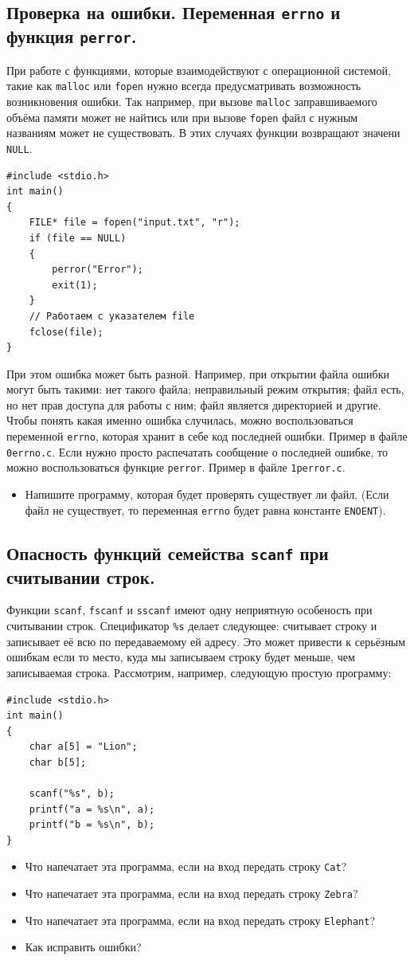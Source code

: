 \documentclass{article}
\begin{document}
\subsection*{Проверка на ошибки. Переменная \texttt{errno} и функция \texttt{perror}.}
При работе с функциями, которые взаимодействуют с операционной системой, такие как \texttt{malloc} или \texttt{fopen} нужно всегда предусматривать возможность возникновения ошибки. Так например, при вызове \texttt{malloc} заправшиваемого объёма памяти может не найтись или при вызове \texttt{fopen} файл с нужным названиям может не существовать. В этих случаях функции возвращают значени \texttt{NULL}.
\begin{lstlisting}
#include <stdio.h>
int main()
{
	FILE* file = fopen("input.txt", "r");
	if (file == NULL)
	{
		perror("Error");
		exit(1);
	}
	// Работаем с указателем file
	fclose(file);
}
\end{lstlisting}
При этом ошибка может быть разной. Например, при открытии файла ошибки могут быть такими: нет такого файла; неправильный режим открытия; файл есть, но нет прав доступа для работы с ним; файл является директорией и другие. Чтобы понять какая именно ошибка случилась, можно воспользоваться переменной \texttt{errno}, которая хранит в себе код последней ошибки. Пример в файле \texttt{0errno.c}. Если нужно просто распечатать сообщение о последней ошибке, то можно воспользоваться функцие \texttt{perror}. Пример в файле \texttt{1perror.c}.
\begin{itemize}
\item Напишите программу, которая будет проверять существует ли файл. (Если файл не существует, то переменная \texttt{errno} будет равна константе \texttt{ENOENT}).
\end{itemize}

\subsection*{Опасность функций семейства \texttt{scanf} при считывании строк.}
Функции \texttt{scanf}, \texttt{fscanf} и \texttt{sscanf} имеют одну неприятную особеность при считывании строк. Спецификатор \texttt{\%s} делает следующее: считывает строку и записывает её всю по передаваемому ей адресу. Это может привести к серьёзным ошибкам если то место, куда мы записываем строку будет меньше, чем записываемая строка. Рассмотрим, например, следующую простую программу:
\begin{lstlisting}
#include <stdio.h>
int main()
{
	char a[5] = "Lion";
	char b[5];
	
	scanf("%s", b);
	printf("a = %s\n", a);
	printf("b = %s\n", b);
}
\end{lstlisting}
\begin{itemize}
\item Что напечатает эта программа, если на вход передать строку \texttt{Cat}?
\item Что напечатает эта программа, если на вход передать строку \texttt{Zebra}?
\item Что напечатает эта программа, если на вход передать строку \texttt{Elephant}?
\item Как исправить ошибки?
\end{itemize}
\end{document}
